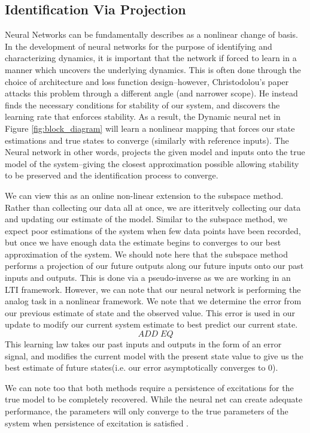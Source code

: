 \documentclass[12pt, letterpaper]{article}
\begin{document}
	\subsection{Identification Via Projection}
	Neural Networks can be fundamentally describes as a nonlinear change of basis. In the development of neural networks for the purpose of identifying and characterizing dynamics, it is important that the network if forced to learn in a manner which uncovers the underlying dynamics\cite{Brunton}. This is often done through the choice of architecture and loss function design--however, Christodolou's paper attacks this problem through a different angle (and narrower scope). He instead finds the necessary conditions for stability of our system, and discovers the learning rate that enforces stability. As a result, the Dynamic neural net in Figure \ref{fig:block_diagram} will learn a nonlinear mapping that forces our state estimations and true states to converge (similarly with reference inputs). The Neural network in other words, projects the given model and inputs onto the true model of the system--giving the closest approximation possible allowing stability to be preserved and the identification process to converge.
	
	We can view this as an online non-linear extension to the subspace method. Rather than collecting our data all at once, we are itteritvely collecting our data and updating our estimate of the model. Similar to the subspace method, we expect poor estimations of the system when few data points have been recorded, but once we have enough data the estimate begins to converges to our best approximation of the system. We should note here that the subspace method performs a projection of our future outputs along our future inputs onto our past inputs and outputs. This is done via a pseudo-inverse as we are working in an LTI framework. However, we can note that our neural network is performing the analog task in a nonlinear framework. We note that we determine the error from our previous estimate of state and the observed value. This error is used in our update to modify our current system estimate to best predict our current state.
	\[ADD \; EQ\]
	 This learning law takes our past inputs and outputs in the form of an error signal, and modifies the current model with the present state value to give us the best estimate of future states(i.e. our error asymptotically converges to 0). 
		
	We can note too that both methods require a persistence of excitations for the true model to be completely recovered. While the neural net can create adequate performance, the parameters will only converge to the true parameters of the system when persistence of excitation is satisfied \cite{Christ}.
	
\end{document}
